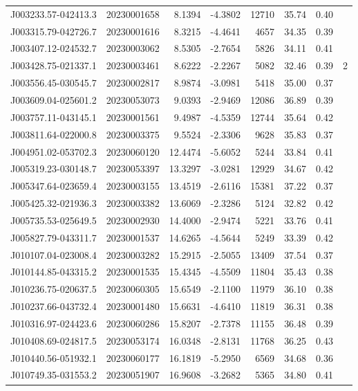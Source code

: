 \documentclass{article}
\begin{document}
\begin {longtable}{|l|l|r|r|r|r|r|l|}
 J003233.57-042413.3&  20230001658&    8.1394&   -4.3802& 12710& 35.74& 0.40&\\
 J003315.79-042726.7&  20230001616&    8.3215&   -4.4641&  4657& 34.35& 0.39&\\
 J003407.12-024532.7&  20230003062&    8.5305&   -2.7654&  5826& 34.11& 0.41&\\
 J003428.75-021337.1&  20230003461&    8.6222&   -2.2267&  5082& 32.46& 0.39&2\\%
 J003556.45-030545.7&  20230002817&    8.9874&   -3.0981&  5418& 35.00& 0.37&\\
 J003609.04-025601.2&  20230053073&    9.0393&   -2.9469& 12086& 36.89& 0.39&\\
 J003757.11-043145.1&  20230001561&    9.4987&   -4.5359& 12744& 35.64& 0.42&\\
 J003811.64-022000.8&  20230003375&    9.5524&   -2.3306&  9628& 35.83& 0.37&\\
 J004951.02-053702.3&  20230060120&   12.4474&   -5.6052&  5244& 33.84& 0.41&\\
 J005319.23-030148.7&  20230053397&   13.3297&   -3.0281& 12929& 34.67& 0.42&\\
 J005347.64-023659.4&  20230003155&   13.4519&   -2.6116& 15381& 37.22& 0.37&\\
 J005425.32-021936.3&  20230003382&   13.6069&   -2.3286&  5124& 32.82& 0.42&\\
 J005735.53-025649.5&  20230002930&   14.4000&   -2.9474&  5221& 33.76& 0.41&\\
 J005827.79-043311.7&  20230001537&   14.6265&   -4.5644&  5249& 33.39& 0.42&\\
 J010107.04-023008.4&  20230003282&   15.2915&   -2.5055& 13409& 37.54& 0.37&\\
 J010144.85-043315.2&  20230001535&   15.4345&   -4.5509& 11804& 35.43& 0.38&\\
 J010236.75-020637.5&  20230060305&   15.6549&   -2.1100& 11979& 36.10& 0.38&\\
 J010237.66-043732.4&  20230001480&   15.6631&   -4.6410& 11819& 36.31& 0.38&\\
 J010316.97-024423.6&  20230060286&   15.8207&   -2.7378& 11155& 36.48& 0.39&\\
 J010408.69-024817.5&  20230053174&   16.0348&   -2.8131& 11768& 36.25& 0.43&\\
 J010440.56-051932.1&  20230060177&   16.1819&   -5.2950&  6569& 34.68& 0.36&\\
 J010749.35-031553.2&  20230051907&   16.9608&   -3.2682&  5365& 34.80& 0.41&\\

\end{longtable}
\end{document}
